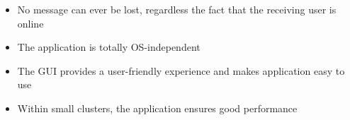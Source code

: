 \begin{itemize}
	\item No message can ever be lost, regardless the fact that the receiving user is online
	\item The application is totally OS-independent
	\item The GUI provides a user-friendly experience and makes application easy to use
	\item Within small clusters, the application ensures good performance
\end{itemize}

